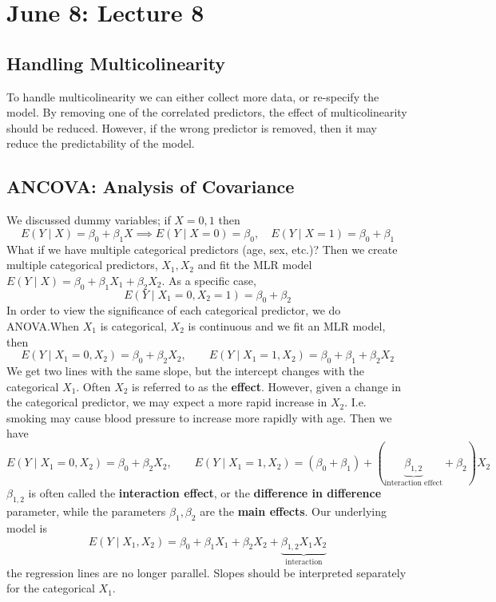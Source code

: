 \documentclass[12pt, a4paper]{article}
\theoremstyle{definition}
\newcommand{\imp}{\implies}
\begin{document}
	\section{June 8: Lecture 8}
	
	\subsection{Handling Multicolinearity}
	
	To handle multicolinearity we can either collect more data, or re-specify the model. By removing one of the correlated predictors, the effect of multicolinearity should be reduced. However, if the wrong predictor is removed, then it may reduce the predictability of the model. 
	
	\subsection{ANCOVA: Analysis of Covariance}
	
	We discussed dummy variables; if $X = 0,1$ then 
	$$E(Y \mid X) = \beta_0 + \beta_1 X \imp E(Y \mid X = 0) = \beta_0,\quad E(Y \mid X = 1) = \beta_0 + \beta_1$$
	What if we have multiple categorical predictors (age, sex, etc.)? Then we create multiple categorical predictors, $X_1, X_2$ and fit the MLR model $E(Y \mid X) = \beta_0 + \beta_1 X_1 + \beta_2 X_2$. As a specific case, 
	$$E(Y \mid X_1 = 0, X_2 = 1) = \beta_0 + \beta_2$$
	In order to view the significance of each categorical predictor, we do ANOVA.When $X_1$ is categorical, $X_2$ is continuous and we fit an MLR model, then 
	$$E(Y \mid X_1 = 0, X_2) = \beta_0 + \beta_2X_2,\qquad E(Y \mid X_1 = 1, X_2) = \beta_0 + \beta_1 + \beta_2X_2$$
	We get two lines with the same slope, but the intercept changes with the categorical $X_1$. Often $X_2$ is referred to as the {\bf effect}. However, given a change in the categorical predictor, we may expect a more rapid increase in $X_2$. I.e. smoking may cause blood pressure to increase more rapidly with age. Then we have 
	$$E(Y \mid X_1 = 0, X_2) = \beta_0 + \beta_2X_2,\qquad E(Y \mid X_1 = 1, X_2) = (\beta_0 + \beta_1) + (\underbrace{\beta_{1,2}}_{\text{interaction effect}} + \beta_2)X_2$$
	$\beta_{1,2}$ is often called the {\bf interaction effect}, or the {\bf difference in difference} parameter, while the parameters $\beta_1, \beta_2$ are the {\bf main effects}. Our underlying model is 
	$$E(Y \mid X_1, X_2) = \beta_0 + \beta_1 X_1 + \beta_2X_2 + \underbrace{\beta_{1,2}X_1X_2}_{\text{interaction}}$$
	the regression lines are no longer parallel. Slopes should be interpreted separately for the categorical $X_1$.
	
\end{document}
